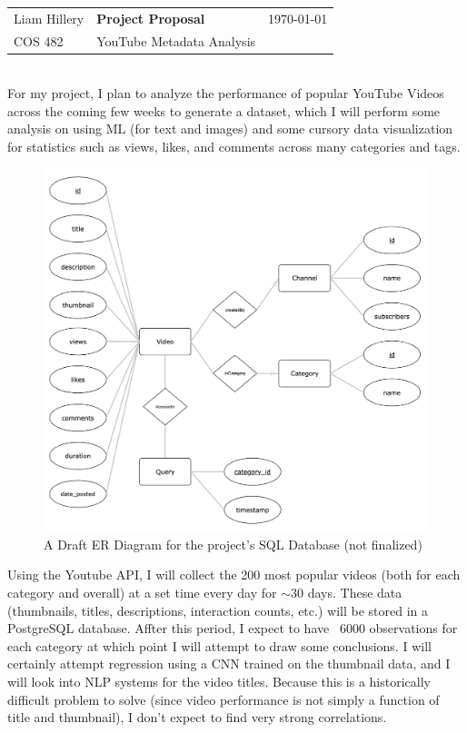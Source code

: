 \documentclass{article}
\begin{document}
	\noindent\begin{tabularx}{\textwidth}{l >{\centering\arraybackslash}X r}
		{Liam Hillery} & {\LARGE \textbf{Project Proposal}} & \today\\
		{\footnotesize {COS 482}} & {\footnotesize {YouTube Metadata Analysis}} & \\\hline
	\end{tabularx}\\
	
	For my project, I plan to analyze the performance of popular YouTube Videos
	across the coming few weeks to generate a dataset, which I will perform some
	analysis on using ML (for text and images) and some cursory data visualization
	for statistics such as views, likes, and comments across many categories and
	tags.

	\begin{figure}[h]
		\center
		\includegraphics[width=.5\textwidth]{Draft ER Diagram.png}
		\caption{A Draft ER Diagram for the project's SQL Database (not finalized)}
	\end{figure}

	Using the Youtube API, I will collect the 200 most popular videos (both for
	each category and overall) at a set time every day for $\sim$30 days. These data
	(thumbnails, titles, descriptions, interaction counts, etc.) will be stored in
	a PostgreSQL database. Affter this period, I expect to have ~6000 observations
	for each category at which point I will attempt to draw some conclusions. I
	will certainly attempt regression using a CNN trained on the thumbnail data,
	and I will look into NLP systems for the video titles. Because this is a
	historically difficult problem to solve (since video performance is not simply
	a function of title and thumbnail), I don't expect to find very strong
	correlations.
\end{document}
